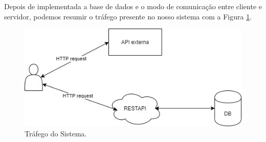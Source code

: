 Depois de implementada a base de dados e o modo de comunicação entre cliente e servidor, podemos resumir o tráfego presente no nosso sistema com a Figura \ref{fig:trafego}.

\begin{figure}[H]
\centering
\includegraphics[width=0.5\linewidth]{images/DiagramaComunicacao.jpg}
\caption{Tráfego do Sistema.}
\label{fig:trafego}
\end{figure}